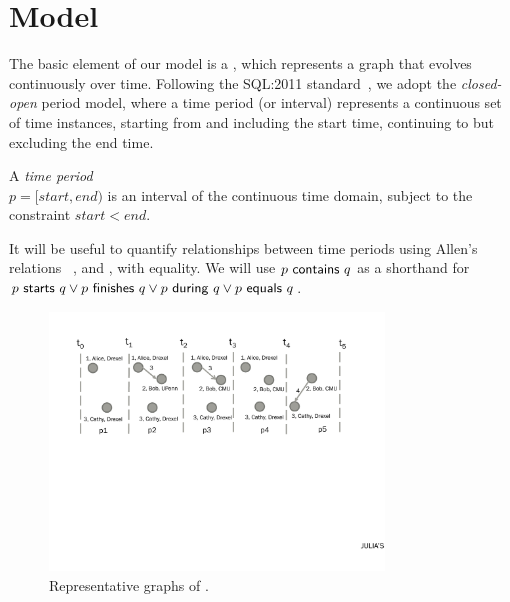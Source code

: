 \section{Model}
\label{sec:model}

The basic element of our model is a \tg, which represents a graph that
evolves continuously over time. Following the SQL:2011
standard~\cite{DBLP:journals/sigmod/KulkarniM12}, we adopt the {\em
  closed-open} period model, where a time period (or interval)
represents a continuous set of time instances, starting from and
including the start time, continuing to but excluding the end time.

\begin{definition}
A {\em time period} \\$p = [start, end)$ is an interval of the
  continuous time domain, subject to the constraint $start < end$.
\label{def:period} 
\end{definition}

It will be useful to quantify relationships between time periods
using Allen's relations~\cite{allen83} ,
 and , with equality.  We will
use $p~\mathsf{contains}~q$ as a shorthand for $p~\mathsf{starts}~q
\vee p~\mathsf{finishes}~q \vee p~\mathsf{during}~q \vee
p~\mathsf{equals}~q$.

\begin{figure}
\centering
\includegraphics[width=3.5in]{figs/T1_graphs.pdf}
\caption{Representative graphs of \tg {}.}
\label{fig:tg_rg}
\end{figure}

